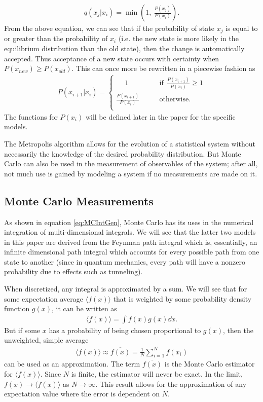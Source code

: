 \documentclass[11pt]{article}
\begin{document}
\begin{align}
	q(x_j|x_i)=\min\left(1,\ \frac{P(x_j)}{P(x_i)}\right).
\end{align}
From the above equation, we can see that if the probability of state $x_j$ is equal to or greater than the probability of $x_i$ (i.e. the new state is more likely in the equilibrium distribution than the old state), then the change is automatically accepted. Thus acceptance of a new state occurs with certainty when $P(x_{new})\geq P(x_{old})$. This can once more be rewritten in a piecewise fashion as
\begin{align}
P(x_{i+1}|x_i)=\begin{cases}
\quad\ 1\qquad&\text{if}\ \ \displaystyle{\frac{P(x_{i+1})}{P(x_i)}\geq1}\\
\displaystyle{\frac{P(x_{i+1})}{P(x_i)}}\qquad&\text{otherwise.}\\
\end{cases}
\end{align}
The functions for $P(x_i)$ will be defined later in the paper for the specific models.

The Metropolis algorithm allows for the evolution of a statistical system without necessarily the knowledge of the desired probability distribution. But Monte Carlo can also be used in the measurement of observables of the system; after all, not much use is gained by modeling a system if no measurements are made on it.

\subsection{Monte Carlo Measurements}
As shown in equation \ref{eq:MCIntGen}, Monte Carlo has its uses in the numerical integration of multi-dimensional integrals. We will see that the latter two models in this paper are derived from the Feynman path integral which is, essentially, an infinite dimensional path integral which accounts for every possible path from one state to another (since in quantum mechanics, every path will have a nonzero probability due to effects such as tunneling).

When discretized, any integral is approximated by a sum. We will see that for some expectation average $\langle f(x)\rangle$ that is weighted by some probability density function $g(x)$, it can be written as
\begin{align}
	\langle f(x)\rangle=\int f(x)g(x)\dd{x}.
\end{align}
But if some $x$ has a probability of being chosen proportional to $g(x)$, then the unweighted, simple average
\begin{align}
	\langle f(x)\rangle\approx\overline{f(x)}=\frac{1}{N}\sum_{i=1}^Nf(x_i)
	\label{eq:MCExp}
\end{align}
can be used as an approximation. The term $\overline{f(x)}$ is the Monte Carlo estimator for $\langle f(x)\rangle$. Since $N$ is finite, the estimator will never be exact. In the limit, $\overline{f(x)}\to\langle f(x)\rangle$ as $N\to\infty$. This result allows for the approximation of any expectation value where the error is dependent on $N$. 
\end{document}
